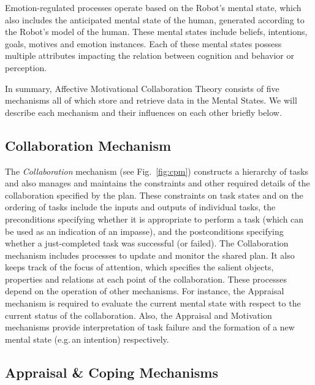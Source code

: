 Emotion-regulated processes operate based on the Robot's mental state, which
also includes the anticipated mental state of the human, generated according to
the Robot's model of the human. These mental states include beliefs, intentions,
goals, motives and emotion instances. Each of these mental states possess
multiple attributes impacting the relation between cognition and behavior or
perception.

In summary, Affective Motivational Collaboration Theory consists of five
mechanisms all of which store and retrieve data in the Mental States. We will
describe each mechanism and their influences on each other briefly below.

\subsection{Collaboration Mechanism}
\label{sec:collaboration-mech}

The \textit{Collaboration} mechanism (see Fig.~\ref{fig:cpm}) constructs
a hierarchy of tasks and also manages and maintains the constraints and other
required details of the collaboration specified by the plan. These constraints
on task states and on the ordering of tasks include the inputs and outputs of
individual tasks, the preconditions specifying whether it is appropriate to
perform a task (which can be used as an indication of an impasse), and the
postconditions specifying whether a just-completed task was successful (or
failed). The Collaboration mechanism includes processes to update and monitor
the shared plan. It also keeps track of the focus of attention, which specifies
the salient objects, properties and relations at each point of the
collaboration. These processes depend on the operation of other mechanisms. For
instance, the Appraisal mechanism is required to evaluate the current mental
state with respect to the current status of the collaboration. Also, the
Appraisal and Motivation mechanisms provide interpretation of task failure and
the formation of a new mental state (e.g.\,an intention) respectively.

\subsection{Appraisal \& Coping Mechanisms}
\label{sec:appraisal-coping-mech}

